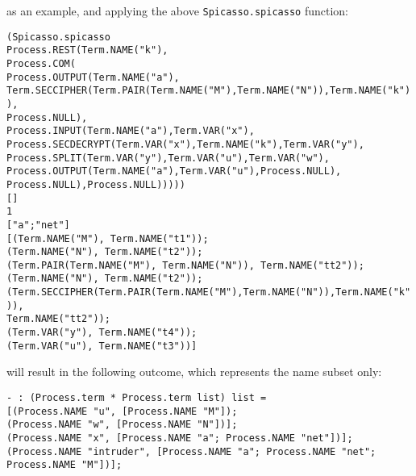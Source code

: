 \documentclass[10pt,a4paper,final,oneside,fleqn]{book}
\begin{document}
\noindent
as an example, and applying the above \texttt{Spicasso.spicasso} function:\vspace{4mm}

\noindent
\texttt{(Spicasso.spicasso}\\ \texttt{Process.REST(Term.NAME("k"),}\\
\texttt{Process.COM(}\\
\texttt{Process.OUTPUT(Term.NAME("a"),}\\
\texttt{Term.SECCIPHER(Term.PAIR(Term.NAME("M"),Term.NAME("N")),Term.NAME("k")),}\\
\texttt{Process.NULL),}\\
\texttt{Process.INPUT(Term.NAME("a"),Term.VAR("x"),}\\
\texttt{Process.SECDECRYPT(Term.VAR("x"),Term.NAME("k"),Term.VAR("y"),}\\
\texttt{Process.SPLIT(Term.VAR("y"),Term.VAR("u"),Term.VAR("w"),}\\
\texttt{Process.OUTPUT(Term.NAME("a"),Term.VAR("u"),Process.NULL),}\\
\texttt{Process.NULL),Process.NULL)))))}\\
\texttt{[]}\\
\texttt{1}\\
\texttt{["a";"\mbox{{\texttt net}}"]}\\
\texttt{[(Term.NAME("M"), Term.NAME("t1"));}\\
\texttt{(Term.NAME("N"), Term.NAME("t2"));}\\
\texttt{(Term.PAIR(Term.NAME("M"), Term.NAME("N")), Term.NAME("tt2"));}\\ \texttt{(Term.NAME("N"), Term.NAME("t2"));}\\
\texttt{(Term.SECCIPHER(Term.PAIR(Term.NAME("M"),Term.NAME("N")),Term.NAME("k")),}\\
\texttt{Term.NAME("tt2"));}\\
\texttt{(Term.VAR("y"), Term.NAME("t4"));}\\
\texttt{(Term.VAR("u"), Term.NAME("t3"))]}\vspace{4mm}

\noindent
will result in the following outcome, which represents the name subset only:\vspace{4mm}

\noindent
\texttt{- : (Process.term * Process.term list) list =}\\
\texttt{[(Process.NAME "u", [Process.NAME "M"]);}\\
\texttt{(Process.NAME "w", [Process.NAME "N"])];}\\
\texttt{(Process.NAME "x", [Process.NAME "a"; Process.NAME "\mbox{{\texttt net}}"])];}\\
\texttt{(Process.NAME "\mbox{{\texttt intruder}}", [Process.NAME "a"; Process.NAME "\mbox{{\texttt net}}";}\\
\texttt{Process.NAME "M"])];}\vspace{6mm}
\end{document}
